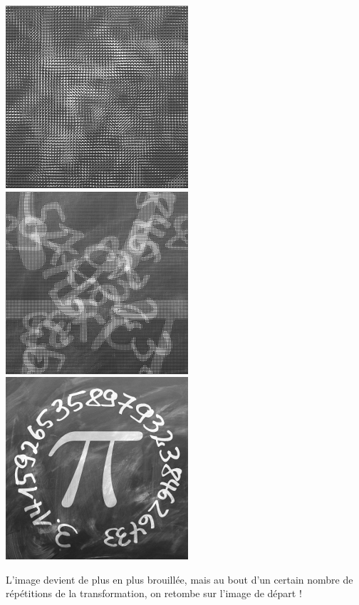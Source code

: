 \documentclass[11pt,class=report,crop=false]{standalone}
\begin{document}
\begin{cours}
\begin{center}
\includegraphics[scale=0.3]{images_fiche/pi_gimp_new_photo_6.png}\qquad
\includegraphics[scale=0.3]{images_fiche/pi_gimp_new_photo_7.png}\qquad
\includegraphics[scale=0.3]{images_fiche/pi_gimp_new_photo_8.png}
\end{center}
L'image devient de plus en plus brouillée, mais au bout d'un certain nombre de répétitions de la transformation, on retombe sur l'image de départ !
\end{cours}




\end{document}
